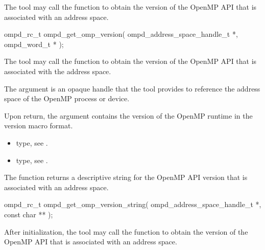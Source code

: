 \label{subsubsubsec:ompd_get_omp_version}

\summary
The tool may call the  function to obtain the version 
of the OpenMP API that is associated with an address space.

\format
\begin{cspecific}
\begin{ompSyntax}
ompd_rc_t ompd_get_omp_version(
  ompd_address_space_handle_t *,
  ompd_word_t *
);
\end{ompSyntax}
\end{cspecific}

\descr
The tool may call the  function to obtain the 
version of the OpenMP API that is associated with the address space.

\argdesc
The  argument is an opaque handle that the tool provides
to reference the address space of the OpenMP process or device.

Upon return, the  argument contains the version of the OpenMP 
runtime in the  version macro format.

\crossreferences
\begin{itemize}
\item {} type, 
see .

\item {} type, see .
\end{itemize}



\label{subsubsubsec:ompd_get_omp_version_string}

\summary
The  function returns a descriptive 
string for the OpenMP API version that is associated with an address space.

\format
\begin{cspecific}
\begin{ompSyntax}
ompd_rc_t ompd_get_omp_version_string(
  ompd_address_space_handle_t *,
  const char **
);
\end{ompSyntax}
\end{cspecific}

\descr
After initialization, the tool may call the  
function to obtain the version of the OpenMP API that is associated with an 
address space.

